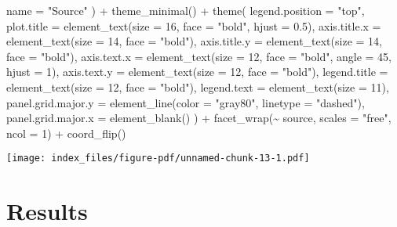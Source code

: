 \documentclass[
  letterpaper,
  DIV=11,
  numbers=noendperiod]{scrartcl}
\newenvironment{Shaded}{\begin{snugshade}}{\end{snugshade}}
\newcommand{\AttributeTok}[1]{\textcolor[rgb]{0.40,0.45,0.13}{#1}}
\newcommand{\DecValTok}[1]{\textcolor[rgb]{0.68,0.00,0.00}{#1}}
\newcommand{\FloatTok}[1]{\textcolor[rgb]{0.68,0.00,0.00}{#1}}
\newcommand{\FunctionTok}[1]{\textcolor[rgb]{0.28,0.35,0.67}{#1}}
\newcommand{\NormalTok}[1]{\textcolor[rgb]{0.00,0.23,0.31}{#1}}
\newcommand{\SpecialCharTok}[1]{\textcolor[rgb]{0.37,0.37,0.37}{#1}}
\newcommand{\StringTok}[1]{\textcolor[rgb]{0.13,0.47,0.30}{#1}}
\begin{document}
\begin{Shaded}
\begin{Highlighting}[]
    \AttributeTok{name =} \StringTok{"Source"}
\NormalTok{  ) }\SpecialCharTok{+}
  \FunctionTok{theme\_minimal}\NormalTok{() }\SpecialCharTok{+}
  \FunctionTok{theme}\NormalTok{(}
    \AttributeTok{legend.position =} \StringTok{"top"}\NormalTok{,}
    \AttributeTok{plot.title =} \FunctionTok{element\_text}\NormalTok{(}\AttributeTok{size =} \DecValTok{16}\NormalTok{, }\AttributeTok{face =} \StringTok{"bold"}\NormalTok{, }\AttributeTok{hjust =} \FloatTok{0.5}\NormalTok{), }
    \AttributeTok{axis.title.x =} \FunctionTok{element\_text}\NormalTok{(}\AttributeTok{size =} \DecValTok{14}\NormalTok{, }\AttributeTok{face =} \StringTok{"bold"}\NormalTok{),}
    \AttributeTok{axis.title.y =} \FunctionTok{element\_text}\NormalTok{(}\AttributeTok{size =} \DecValTok{14}\NormalTok{, }\AttributeTok{face =} \StringTok{"bold"}\NormalTok{),}
    \AttributeTok{axis.text.x =} \FunctionTok{element\_text}\NormalTok{(}\AttributeTok{size =} \DecValTok{12}\NormalTok{, }\AttributeTok{face =} \StringTok{"bold"}\NormalTok{, }\AttributeTok{angle =} \DecValTok{45}\NormalTok{, }\AttributeTok{hjust =} \DecValTok{1}\NormalTok{), }
    \AttributeTok{axis.text.y =} \FunctionTok{element\_text}\NormalTok{(}\AttributeTok{size =} \DecValTok{12}\NormalTok{, }\AttributeTok{face =} \StringTok{"bold"}\NormalTok{),}
    \AttributeTok{legend.title =} \FunctionTok{element\_text}\NormalTok{(}\AttributeTok{size =} \DecValTok{12}\NormalTok{, }\AttributeTok{face =} \StringTok{"bold"}\NormalTok{),}
    \AttributeTok{legend.text =} \FunctionTok{element\_text}\NormalTok{(}\AttributeTok{size =} \DecValTok{11}\NormalTok{),}
    \AttributeTok{panel.grid.major.y =} \FunctionTok{element\_line}\NormalTok{(}\AttributeTok{color =} \StringTok{"gray80"}\NormalTok{, }\AttributeTok{linetype =} \StringTok{"dashed"}\NormalTok{), }
    \AttributeTok{panel.grid.major.x =} \FunctionTok{element\_blank}\NormalTok{() }
\NormalTok{  ) }\SpecialCharTok{+}
  \FunctionTok{facet\_wrap}\NormalTok{(}\SpecialCharTok{\textasciitilde{}}\NormalTok{ source, }\AttributeTok{scales =} \StringTok{"free"}\NormalTok{, }\AttributeTok{ncol =} \DecValTok{1}\NormalTok{) }\SpecialCharTok{+}
  \FunctionTok{coord\_flip}\NormalTok{() }
\end{Highlighting}
\end{Shaded}

\texttt{[image: index\_files/figure-pdf/unnamed-chunk-13-1.pdf]}

\section{Results}\label{results}
\end{document}

